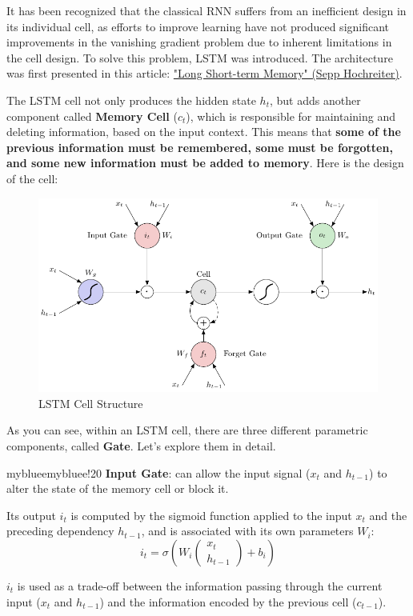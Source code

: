 It has been recognized that the classical RNN suffers from an inefficient design in its individual cell, as efforts to improve learning have not produced significant improvements in the vanishing gradient problem due to inherent limitations in the cell design. To solve this problem, LSTM was introduced. The architecture was first presented in this article: \href{https://deeplearning.cs.cmu.edu/F23/document/readings/LSTM.pdf}{"Long Short-term Memory" (Sepp Hochreiter)}.

The LSTM cell not only produces the hidden state $h_t$, but adds another component called \textbf{Memory Cell} ($c_t$), which is responsible for maintaining and deleting information, based on the input context. This means that \textbf{some of the previous information must be remembered, some must be forgotten, and some new information must be added to memory}. Here is the design of the cell:

\begin{figure}[!htbp]
    \centering
    \includegraphics[width=\linewidth]{tikz/chapter6 - LSTM.pdf}
    \caption{LSTM Cell Structure}
\end{figure}

As you can see, within an LSTM cell, there are three different parametric components, called \textbf{Gate}. Let's explore them in detail.

\begin{remark}{mybluee}{mybluee!20}
\textbf{Input Gate}: can allow the input signal ($x_t$ and $h_{t-1}$) to alter the state of the memory cell or block it.

Its output $i_t$ is computed by the sigmoid function applied to the input $x_t$ and the preceding dependency $h_{t-1}$, and is associated with its own parameters $W_i$:
$$ i_t = \sigma(W_i
\begin{pmatrix}
x_t \\
h_{t-1}
\end{pmatrix} + b_i)
$$

$i_t$ is used as a trade-off between the information passing through the current input ($x_t$ and $h_{t-1}$) and the information encoded by the previous cell ($c_{t-1}$).
\end{remark}

